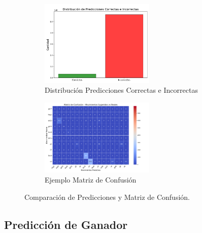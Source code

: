 \documentclass[a4paper,12pt]{article}
\begin{document}
\begin{figure}[H]
    \centering
    \begin{subfigure}[b]{\textwidth}
        \centering
        \includegraphics[width=0.6\textwidth]{../images/Figure_1_pred.png}
        \caption{Distribución Predicciones Correctas e Incorrectas}
        \label{fig:rDistribucion_Predicciones}
    \end{subfigure}
    
    \vspace{5pt} %
    
    \begin{subfigure}[b]{\textwidth}
        \centering
        \includegraphics[width=0.6\textwidth]{../images/Figure_sug.png}
        \caption{Ejemplo Matriz de Confusión}
        \label{fig:Matriz_confusion}
    \end{subfigure}

    \caption{Comparación de Predicciones y Matriz de Confusión.}
    \label{fig:figuras_combinadas}
\end{figure}

\newpage

\subsection{Predicción de Ganador}
\end{document}
